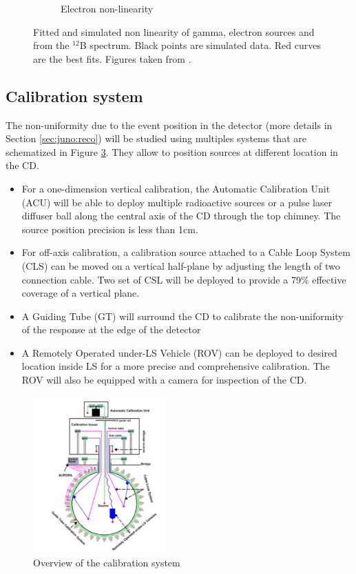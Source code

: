 \documentclass[../main.tex]{subfiles}
\begin{document}
\begin{figure}[ht]
\begin{subfigure}[b]{0.37\textwidth}
    \caption{Electron non-linearity}
    \label{fig:juno:nl:electron}
  \end{subfigure}
  \caption{Fitted and simulated non linearity of gamma, electron sources and from the $^{12}$B spectrum. Black points are simulated data. Red curves are the best fits. Figures taken from \cite{juno_collaboration_calibration_2021}.}
  \label{fig:juno:nl}
\end{figure}

\subsection{Calibration system}

The non-uniformity due to the event position in the detector (more details in Section \ref{sec:juno:reco}) will be studied using multiples systems that are schematized in Figure \ref{fig:juno:calib}. They allow to position sources at different location in the CD.

\begin{itemize}
  \item For a one-dimension vertical calibration, the Automatic Calibration Unit (ACU) will be able to deploy multiple radioactive sources or a pulse laser diffuser ball along the central axis of the CD through the top chimney. The source position precision is less than 1cm.
  \item For off-axis calibration, a calibration source attached to a Cable Loop System (CLS) can be moved on a vertical half-plane by adjusting the length of two connection cable. Two set of CSL will be deployed to provide a 79\% effective coverage of a vertical plane.
  \item A Guiding Tube (GT) will surround the CD to calibrate the non-uniformity of the response at the edge of the detector
  \item A Remotely Operated under-LS Vehicle (ROV) can be deployed to desired location inside LS for a more precise and comprehensive calibration. The ROV will also be equipped with a camera for inspection of the CD.
\end{itemize}

\begin{figure}[ht]
  \centering
  \includegraphics[height=6cm]{images/juno/calib.png}
  \caption{Overview of the calibration system}
  \label{fig:juno:calib}
\end{figure}
\end{document}

